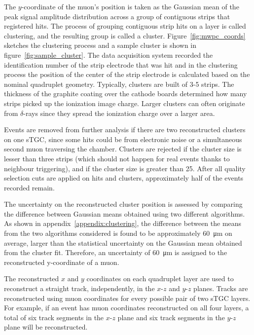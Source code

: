 The $y$-coordinate of the muon's position is taken as the Gaussian mean of the peak signal amplitude distribution across a group of contiguous strips that registered hits. The process of grouping contiguous strip hits on a layer is called clustering, and the resulting group is called a cluster. Figure~\ref{fig:mwpc_coords} sketches the clustering process and a sample cluster is shown in figure~\ref{fig:sample_cluster}. The data acquisition system recorded the identification number of the strip electrode that was hit and in the clustering process the position of the center of the strip electrode is calculated based on the nominal quadruplet geometry. Typically, clusters are built of 3-5 strips. The thickness of the graphite coating over the cathode boards determined how many strips picked up the ionization image charge. Larger clusters can often originate from $\delta$-rays since they spread the ionization charge over a larger area.

Events are removed from further analysis if there are two reconstructed clusters on one sTGC, since some hits could be from electronic noise or a simultaneous second muon traversing the chamber. Clusters are rejected if the cluster size is lesser than three strips (which should not happen for real events thanks to neighbour triggering), and if the cluster size is greater than 25. After all quality selection cuts are applied on hits and clusters, approximately half of the events recorded remain.

The uncertainty on the reconstructed cluster position is assessed by comparing the difference between Gaussian means obtained using two different algorithms. As shown in appendix~\ref{appendix:clustering}, the difference between the means from the two algorithms considered is found to be approximately \SI{60}{\micro\meter} on average, larger than the statistical uncertainty on the Gaussian mean obtained from the cluster fit. Therefore, an uncertainty of \SI{60}{\micro\meter} is assigned to the reconstructed y-coordinate of a muon. 

The reconstructed $x$ and $y$ coordinates on each quadruplet layer are used to reconstruct a straight track, independently, in the $x$-$z$ and $y$-$z$ planes. Tracks are reconstructed using muon coordinates for every possible pair of two sTGC layers.  For example, if an event has muon coordinates reconstructed on all four layers, a total of six track segments in the $x$-$z$ plane and six track segments in the $y$-$z$ plane will be reconstructed. 



